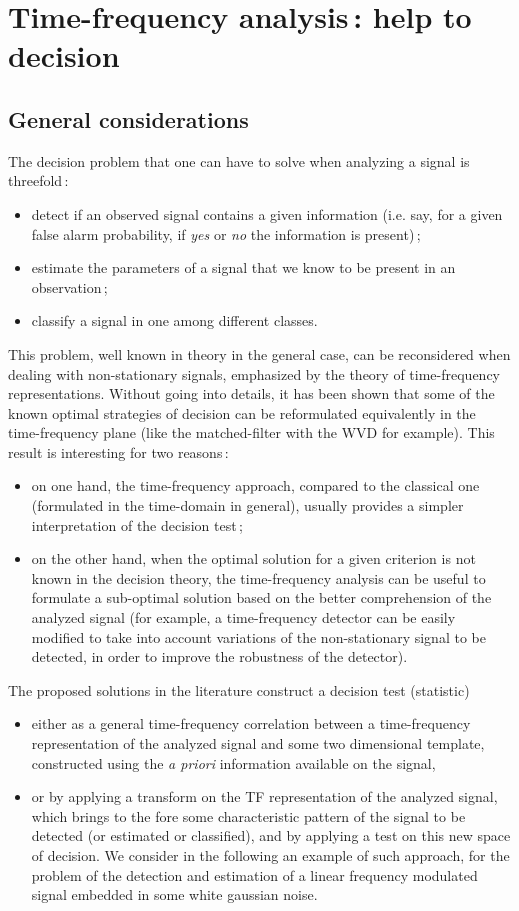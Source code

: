\section{Time-frequency analysis\,: help to decision}
 
\subsection{General considerations}
  The decision problem that one can have to solve when analyzing a
signal is threefold\,:
\begin{itemize}
\item detect if an observed signal contains a given information (i.e. say,
for a given false alarm probability, if {\it yes} or {\it no} the
information is present)\,;
\item estimate the parameters of a signal that we know to be present in
an observation\,;
\item classify a signal in one among different classes.
\end{itemize}
This problem, well known in theory in the general case, can be
reconsidered when dealing with non-stationary signals, emphasized by
the theory of time-frequency representations. Without going into
details, it has been shown that some of the known optimal strategies
of decision can be reformulated equivalently in the time-frequency
plane (like the matched-filter with the WVD for example). This result
is interesting for two reasons\,:
\begin{itemize}
\item on one hand, the time-frequency approach, compared to the
classical one (formulated in the time-domain in general), usually
provides a simpler interpretation of the decision test\,;
\item on the other hand, when the optimal solution for a given criterion
is not known in the decision theory, the time-frequency analysis can
be useful to formulate a sub-optimal solution based on the better
comprehension of the analyzed signal (for example, a time-frequency
detector can be easily modified to take into account variations of the
non-stationary signal to be detected, in order to improve the
robustness of the detector).
\end{itemize}
  The proposed solutions in the literature construct a decision test
(statistic) 
\begin{itemize}
\item either as a general time-frequency correlation between a
time-frequency representation of the analyzed signal and some two
dimensional template, constructed using the {\it a priori} information
available on the signal,
\item or by applying a transform on the TF representation of the
analyzed signal, which brings to the fore some characteristic pattern
of the signal to be detected (or estimated or classified), and by
applying a test on this new space of decision. We consider in the
following an example of such approach, for the problem of the
detection and estimation of a linear frequency modulated signal
embedded in some white gaussian noise.
\end{itemize}


